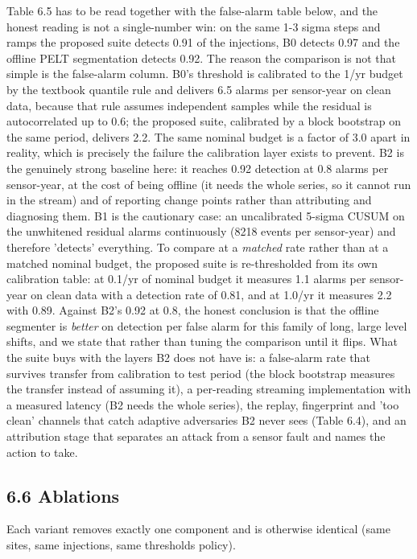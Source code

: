 \documentclass[10pt,a4paper]{article}
\begin{document}
Table 6.5 has to be read together with the false-\allowbreak{}alarm table below, and the honest reading is not a single-\allowbreak{}number win: on the same 1-\allowbreak{}3 sigma steps and ramps the proposed suite detects 0.91 of the injections, B0 detects 0.97 and the offline PELT segmentation detects 0.92. The reason the comparison is not that simple is the false-\allowbreak{}alarm column. B0's threshold is calibrated to the 1/\allowbreak{}yr budget by the textbook quantile rule and delivers 6.5 alarms per sensor-\allowbreak{}year on clean data, because that rule assumes independent samples while the residual is autocorrelated up to 0.6; the proposed suite, calibrated by a block bootstrap on the same period, delivers 2.2. The same nominal budget is a factor of 3.0 apart in reality, which is precisely the failure the calibration layer exists to prevent. B2 is the genuinely strong baseline here: it reaches 0.92 detection at 0.8 alarms per sensor-\allowbreak{}year, at the cost of being offline (it needs the whole series, so it cannot run in the stream) and of reporting change points rather than attributing and diagnosing them. B1 is the cautionary case: an uncalibrated 5-\allowbreak{}sigma CUSUM on the unwhitened residual alarms continuously (8218 events per sensor-\allowbreak{}year) and therefore 'detects' everything. To compare at a \emph{matched} rate rather than at a matched nominal budget, the proposed suite is re-\allowbreak{}thresholded from its own calibration table: at 0.1/\allowbreak{}yr of nominal budget it measures 1.1 alarms per sensor-\allowbreak{}year on clean data with a detection rate of 0.81, and at 1.0/\allowbreak{}yr it measures 2.2 with 0.89. Against B2's 0.92 at 0.8, the honest conclusion is that the offline segmenter is \emph{better} on detection per false alarm for this family of long, large level shifts, and we state that rather than tuning the comparison until it flips. What the suite buys with the layers B2 does not have is: a false-\allowbreak{}alarm rate that survives transfer from calibration to test period (the block bootstrap measures the transfer instead of assuming it), a per-\allowbreak{}reading streaming implementation with a measured latency (B2 needs the whole series), the replay, fingerprint and 'too clean' channels that catch adaptive adversaries B2 never sees (Table 6.4), and an attribution stage that separates an attack from a sensor fault and names the action to take.

\subsection*{6.6 Ablations}
Each variant removes exactly one component and is otherwise identical (same sites, same injections, same thresholds policy).
\end{document}
